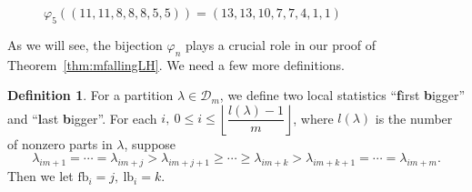 \documentclass[11pt,reqno]{amsart}
\numberwithin{equation}{section}
\theoremstyle{plain}
\theoremstyle{definition}
\newtheorem{Def}[theorem]{Definition}
\newcommand{\D}{\mathcal{D}}
\newcommand{\redd}{\textcolor{red}}
\def\fb{\mathrm{fb}}
\def\lb{\mathrm{lb}}
\begin{document}
\begin{figure}[htp]
\begin{ferrers}
\putbelow
{}

\highlightcellbyletter{9}{1}{$\redd{3}$}
\highlightcellbyletter{12}{1}{$\redd{2}$}


\putright
{}
\highlightcellbyletter{10}{1}{$\redd{3}$}
\highlightcellbyletter{7}{2}{$\redd{2}$}

\putright
{}
\end{ferrers}
\caption{$\varphi_5((11,11,8,8,8, 5,5))=(13,13,10,7, 7, 4,1,1)$}
\label{insertion}
\end{figure}



As we will see, the bijection $\varphi_n$ plays a crucial role in our proof of Theorem~\ref{thm:mfallingLH}. We need a few more definitions.










\begin{Def}
For a partition $\lambda\in\D_m$, we define two local statistics ``\textbf{f}irst \textbf{b}igger'' and ``\textbf{l}ast \textbf{b}igger''. For each $i,\:0\le i\le\left\lfloor\dfrac{l(\lambda)-1}{m}\right\rfloor$, where $l(\lambda)$ is the number of nonzero parts in $\lambda$, suppose
$$
\lambda_{im+1}=\cdots=\lambda_{im+j}>\lambda_{im+j+1}\ge\cdots\ge\lambda_{im+k}>\lambda_{im+k+1}=\cdots=\lambda_{im+m}.
$$
Then we let $\fb_i=j,\:\lb_i=k$.
\end{Def}
\end{document}
